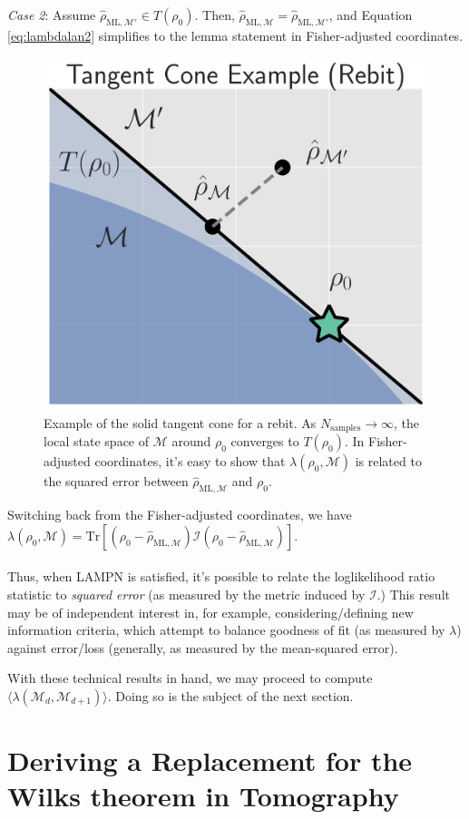 \documentclass[aps,pra, twocolumn]{revtex4-1}
\newcommand{\M}{\mathcal{M}}
\newcommand{\rhohat}{\hat{\rho}}
\newcommand{\rhoML}[1]{\rhohat_{\scriptscriptstyle{\mathrm{ML},#1}}}
\begin{document}
\emph{Case 2}: Assume $\rhoML{\M'} \in T(\rho_{0})$. Then, $\rhoML{\M}= \rhoML{\M'}$, and Equation \eqref{eq:lambdalan2} simplifies to the lemma statement in Fisher-adjusted coordinates.
\begin{figure}
\includegraphics[width=.75\columnwidth]{Images/Figure_temp.pdf}
 \caption{Example of the solid tangent cone for a rebit. As $N_{\mathrm{samples}} \rightarrow \infty$, the local state space of $\M$ around $\rho_{0}$ converges to $T(\rho_{0})$. In Fisher-adjusted coordinates, it's easy to show that $\lambda(\rho_{0}, \M)$ is related to the squared error between $\rhoML{\M}$ and $\rho_{0}$.}
\label{fig:tangentcone}
\end{figure}

Switching back from the Fisher-adjusted coordinates, we have $\lambda(\rho_{0}, \M) = \mathrm{Tr}[(\rho_{0} - \rhoML{\M})\mathcal{I}(\rho_{0} - \rhoML{\M})]$.
~\\~\\
Thus, when LAMPN is satisfied, it's possible to relate the loglikelihood ratio statistic to \emph{squared error} (as measured by the metric induced by $\mathcal{I}$.) This result may be of independent interest in, for example, considering/defining new information criteria, which attempt to balance goodness of fit (as measured by $\lambda$) against error/loss (generally, as measured by the mean-squared error).

With these technical results in hand, we may proceed to compute $\langle \lambda(\M_{d}, \M_{d+1})\rangle$. Doing so is the subject of the next section.

\section{Deriving a Replacement for the Wilks theorem in Tomography}
\label{sec:computingllrs}
\end{document}
